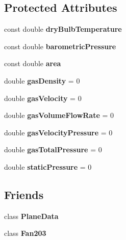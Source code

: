 \subsection*{Protected Attributes}
\begin{DoxyCompactItemize}
\item 
\mbox{\label{class_planar_afdc9d4149cae09c9e49aa323a814616c}} 
const double {\bfseries dry\+Bulb\+Temperature}
\item 
\mbox{\label{class_planar_a0a2be6e6cadb8550921914ecdd43b80f}} 
const double {\bfseries barometric\+Pressure}
\item 
\mbox{\label{class_planar_a561590931d1cb7b592eeba9f3685d3c3}} 
const double {\bfseries area}
\item 
\mbox{\label{class_planar_a3585f60cf8a2a9e4b80954118337c8cf}} 
double {\bfseries gas\+Density} = 0
\item 
\mbox{\label{class_planar_adf99a402e9af6a851ee94bd8dad5700a}} 
double {\bfseries gas\+Velocity} = 0
\item 
\mbox{\label{class_planar_a6597ec3a9de6863ecfe3c5e923048783}} 
double {\bfseries gas\+Volume\+Flow\+Rate} = 0
\item 
\mbox{\label{class_planar_a4bec44a97d38f8b98d3839c885350512}} 
double {\bfseries gas\+Velocity\+Pressure} = 0
\item 
\mbox{\label{class_planar_a67711087a384aa3165fb7990e72193c5}} 
double {\bfseries gas\+Total\+Pressure} = 0
\item 
\mbox{\label{class_planar_a4ee994f45b58125cbd81998a84f860a6}} 
double {\bfseries static\+Pressure} = 0
\end{DoxyCompactItemize}
\subsection*{Friends}
\begin{DoxyCompactItemize}
\item 
\mbox{\label{class_planar_a31f6bbdce0894df6a817f493afffda84}} 
class {\bfseries Plane\+Data}
\item 
\mbox{\label{class_planar_ad537df0087a4a6f474dc9d50579cc33d}} 
class {\bfseries Fan203}
\end{DoxyCompactItemize}


